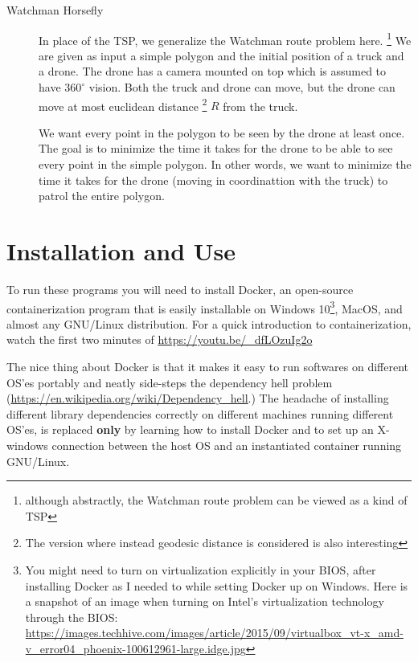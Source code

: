 \documentclass[11.5pt]{report}
\begin{document}
\begin{description}
\item[Watchman Horsefly] In place of the TSP, we generalize the Watchman route problem here. 
  \footnote{ although abstractly, the Watchman route problem can be viewed as a kind of TSP}
  We are given as input a simple polygon and the initial position of a truck and a drone. The drone has 
  a camera mounted on top which is assumed to have $360^{\circ}$ vision. Both the truck and drone can move, 
  but the drone can move at most euclidean distance \footnote{The version where instead geodesic distance is 
    considered is also interesting} $R$ from the truck. 

  We want every point in the polygon to be seen by the drone at least once. The goal is to minimize the time it 
  takes for the drone to be able to see every point in the simple polygon. In other words, we want to minimize
  the time it takes for the drone (moving in coordinattion with the truck) to patrol the entire polygon. 
  
\end{description}

\chapter{Installation and Use}

To run these programs you will need to install Docker, an open-source containerization program that is easily installable on 
  Windows 10\footnote{You might need to turn on virtualization explicitly in your BIOS, after installing Docker 
  as I needed to while setting Docker up on Windows. Here is a snapshot of an image when turning on Intel's 
  virtualization technology through the BIOS: 
\url{https://images.techhive.com/images/article/2015/09/virtualbox_vt-x_amd-v_error04_phoenix-100612961-large.idge.jpg}}, MacOS, and almost any 
  GNU/Linux distribution. For a quick introduction to containerization, watch the first two minutes of 
  \url{https://youtu.be/_dfLOzuIg2o}

The nice thing about Docker is that it makes it easy to run softwares on different OS'es portably and neatly side-steps the 
dependency hell problem (\url{https://en.wikipedia.org/wiki/Dependency_hell}.) The headache of installing different library 
dependencies correctly on different machines running different OS'es, is replaced \textbf{only} by learning how to 
install Docker and to set up an X-windows connection between the host OS and an instantiated container running GNU/Linux. 
\end{document}
